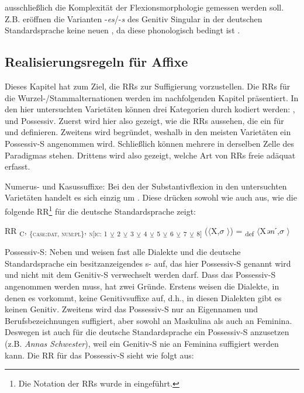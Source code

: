 ausschließlich die Komplexität der Flexionsmorphologie gemessen werden soll. Z.B. eröffnen die Varianten -\textit{es}/-\textit{s} des Genitiv Singular in der deutschen Standardsprache keine neuen , da diese  phonologisch bedingt ist \citep[224-225]{EisenbergGelhausHenneSittaWellmann1998}.

\subsection{Realisierungsregeln für Affixe}\label{5.1.2}

Dieses Kapitel hat zum Ziel, die RRs zur Suffigierung vorzustellen. Die RRs für die Wur\-zel-/Stamm\-al\-ter\-na\-tio\-nen werden im nachfolgenden Kapitel präsentiert. In den hier untersuchten Varietäten können drei Kategorien durch  kodiert werden: ,  und Possessiv. Zuerst wird hier also gezeigt, wie die RRs aussehen, die ein  für  und  definieren. Zweitens wird begründet, weshalb in den meisten Varietäten ein Possessiv-S angenommen wird. Schließlich können mehrere  in derselben Zelle des Paradigmas stehen. Drittens wird also gezeigt, welche Art von RRs freie  adäquat erfasst.

\noindent
{Numerus- und Kasussuffixe}: Bei den  der Substantivflexion in den untersuchten Varietäten handelt es sich einzig um . Diese  drücken sowohl  wie auch  aus, wie die folgende RR\footnote{Die Notation der RRs wurde in  eingeführt.} für die deutsche Standardsprache zeigt:

\begin{exe}
 RR \textsubscript{C}, \textsubscript{\{\textsc{case:dat}, \textsc{num:pl}\}}, \textsubscript{\textsc{n[}\textsc{ic:} 1} \textsubscript{\tiny $\veebar$}\textsubscript{ 2} \textsubscript{\tiny $\veebar$}\textsubscript{ 3} \textsubscript{\tiny $\veebar$}\textsubscript{ 4} \textsubscript{\tiny $\veebar$}\textsubscript{ 5} \textsubscript{\tiny $\veebar$}\textsubscript{ 6} \textsubscript{\tiny $\veebar$}\textsubscript{ 7} \textsubscript{${\veebar}$}\textsubscript{ 8]} ($\langle$X,$\sigma$ $\rangle$) = \textsubscript{def} $\langle$X\textit{ən}ˊ,$\sigma$ $\rangle$\\
\end{exe}

\noindent
{Possessiv-S}: Neben  und  weisen fast alle Dialekte und die deutsche Standardsprache ein besitzanzeigendes s- auf, das hier Possessiv-S genannt wird und nicht mit dem Genitiv-S verwechselt werden darf. Dass das Possessiv-S angenommen werden muss, hat zwei Gründe. Erstens weisen die Dialekte, in denen es vorkommt, keine Genitivsuffixe auf, d.h., in diesen Dialekten gibt es keinen Genitiv. Zweitens wird das Possessiv-S nur an Eigennamen und Berufsbezeichnungen suffigiert, aber sowohl an Maskulina als auch an Feminina. Deswegen ist auch für die deutsche Standardsprache ein Possessiv-S anzusetzen (z.B. \textit{Annas Schwester}), weil ein Genitiv-S nie an Feminina suffigiert werden kann. Die RR für das Possessiv-S sieht wie folgt aus:

